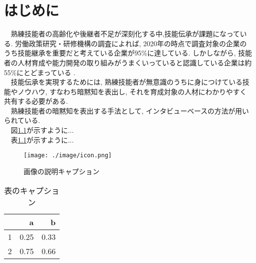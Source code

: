 \chapter{はじめに}
　熟練技能者の高齢化や後継者不足が深刻化する中,技能伝承が課題になっている. 労働政策研究・研修機構の調査によれば, 2020年の時点で調査対象の企業のうち技能継承を重要だと考えている企業が95\%に達している. しかしながら, 技能者の人材育成や能力開発の取り組みがうまくいっていると認識している企業は約55\%にとどまっている \cite{JILPT2020}. \\
　技能伝承を実現するためには, 熟練技能者が無意識のうちに身につけている技能やノウハウ, すなわち暗黙知を表出し, それを育成対象の人材にわかりやすく共有する必要がある.\\
　熟練技能者の暗黙知を表出する手法として, インタビューベースの方法が用いられている\cite{Onozato1998, Yashiro2021,Ogawa2011}. \\
　図\ref{fig1}が示すように...\\
　表\ref{table1}が示すように...\\

\begin{figure}[htbp]
    \centering
    \texttt{[image: ./image/icon.png]}
    \caption{画像の説明キャプション}
    \label{fig1}
\end{figure}

\begin{table}[h]
    \centering
    \begin{tabular}{r|rr}
    & a & b\\ \hline
    1& 0.25 & 0.33\\
    2& 0.75 & 0.66\\
    \end{tabular}
    \caption{表のキャプション}
    \label{table1}
\end{table}